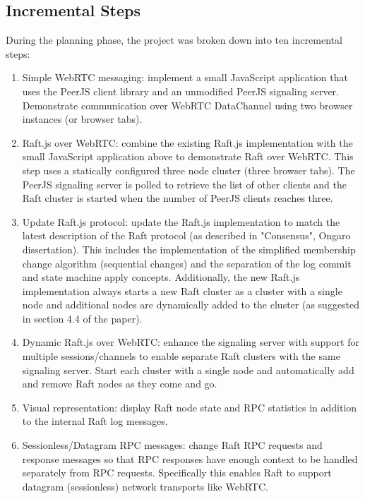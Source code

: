 \documentclass[9pt]{extarticle}
\begin{document}
\begin{multicols}{2}

\subsection{Incremental Steps}

During the planning phase, the project was broken down into ten incremental steps:

\begin{enumerate}
\item Simple WebRTC messaging: implement a small JavaScript application that uses the PeerJS client library and an unmodified PeerJS signaling server. Demonstrate communication over WebRTC DataChannel using two browser instances (or browser tabs).

\item Raft.js over WebRTC: combine the existing Raft.js implementation with the small JavaScript application above to demonstrate Raft over WebRTC. This step uses a statically configured three node cluster (three browser tabs). The PeerJS signaling server is polled to retrieve the list of other clients and the Raft cluster is started when the number of PeerJS clients reaches three.

\item Update Raft.js protocol: update the Raft.js implementation to match the latest description of the Raft protocol (as described in "Consensus", Ongaro dissertation). This includes the implementation of the simplified membership change algorithm (sequential changes) and the separation of the log commit and state machine apply concepts. Additionally, the new Raft.js implementation always starts a new Raft cluster as a cluster with a single node and additional nodes are dynamically added to the cluster (as suggested in section 4.4 of the paper).

\item Dynamic Raft.js over WebRTC: enhance the signaling server with support for multiple sessions/channels to enable separate Raft clusters with the same signaling server. Start each cluster with a single node and automatically add and remove Raft nodes as they come and go.

\item Visual representation: display Raft node state and RPC statistics in addition to the internal Raft log messages.

\item Sessionless/Datagram RPC messages: change Raft RPC requests and response messages so that RPC responses have enough context to be handled separately from RPC requests. Specifically this enables Raft to support datagram (sessionless) network transports like WebRTC.


\end{enumerate}
\end{multicols}
\end{document}
